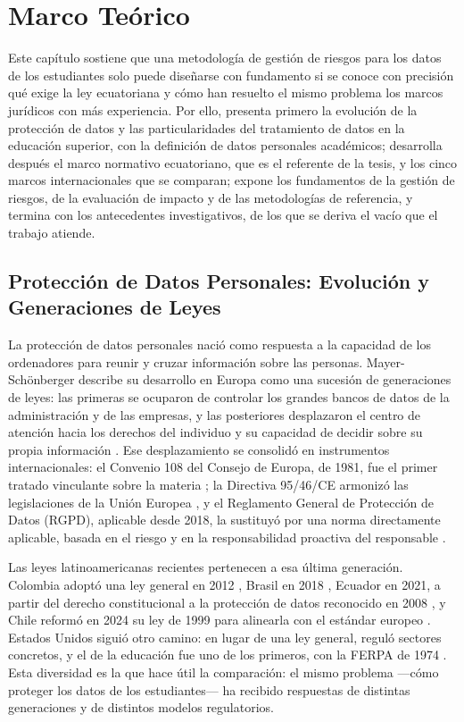 \chapter{Marco Teórico}
\label{chap:fundamentacion}

Este capítulo sostiene que una metodología de gestión de riesgos para los datos de los estudiantes solo puede diseñarse con fundamento si se conoce con precisión qué exige la ley ecuatoriana y cómo han resuelto el mismo problema los marcos jurídicos con más experiencia. Por ello, presenta primero la evolución de la protección de datos y las particularidades del tratamiento de datos en la educación superior, con la definición de datos personales académicos; desarrolla después el marco normativo ecuatoriano, que es el referente de la tesis, y los cinco marcos internacionales que se comparan; expone los fundamentos de la gestión de riesgos, de la evaluación de impacto y de las metodologías de referencia, y termina con los antecedentes investigativos, de los que se deriva el vacío que el trabajo atiende.

\section{Protección de Datos Personales: Evolución y Generaciones de Leyes}
\label{sec:evolucion}

La protección de datos personales nació como respuesta a la capacidad de los ordenadores para reunir y cruzar información sobre las personas. Mayer-Schönberger describe su desarrollo en Europa como una sucesión de generaciones de leyes: las primeras se ocuparon de controlar los grandes bancos de datos de la administración y de las empresas, y las posteriores desplazaron el centro de atención hacia los derechos del individuo y su capacidad de decidir sobre su propia información \cite{mayer1997generational}. Ese desplazamiento se consolidó en instrumentos internacionales: el Convenio 108 del Consejo de Europa, de 1981, fue el primer tratado vinculante sobre la materia \cite{coe1981convenio108}; la Directiva 95/46/CE armonizó las legislaciones de la Unión Europea \cite{ue1995directiva}, y el Reglamento General de Protección de Datos (RGPD), aplicable desde 2018, la sustituyó por una norma directamente aplicable, basada en el riesgo y en la responsabilidad proactiva del responsable \cite{rgpd2016}.

Las leyes latinoamericanas recientes pertenecen a esa última generación. Colombia adoptó una ley general en 2012 \cite{colombia2012ley1581}, Brasil en 2018 \cite{brasil2018lgpd}, Ecuador en 2021, a partir del derecho constitucional a la protección de datos reconocido en 2008 \cite{lopdp2021,constitucion2008}, y Chile reformó en 2024 su ley de 1999 para alinearla con el estándar europeo \cite{chile2024ley21719}. Estados Unidos siguió otro camino: en lugar de una ley general, reguló sectores concretos, y el de la educación fue uno de los primeros, con la FERPA de 1974 \cite{ferpa1974}. Esta diversidad es la que hace útil la comparación: el mismo problema ---cómo proteger los datos de los estudiantes--- ha recibido respuestas de distintas generaciones y de distintos modelos regulatorios.

